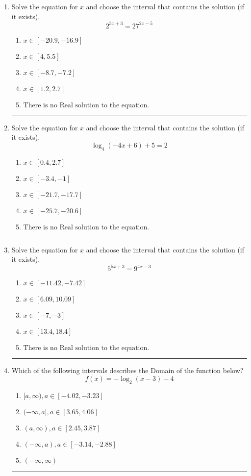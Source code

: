 \documentclass[14pt]{extbook}
\newcommand{\litem}[1]{\item#1\hspace*{-1cm}\rule{\textwidth}{0.4pt}}
\begin{document}
\begin{enumerate}
{\begin{enumerate}[label=\Alph*.]
\end{enumerate} }
\litem{
Solve the equation for $x$ and choose the interval that contains the solution (if it exists).\[ 2^{3x+3} = 27^{2x-5} \]\begin{enumerate}[label=\Alph*.]
\item \( x \in [-20.9, -16.9] \)
\item \( x \in [4, 5.5] \)
\item \( x \in [-8.7, -7.2] \)
\item \( x \in [1.2, 2.7] \)
\item \( \text{There is no Real solution to the equation.} \)

\end{enumerate} }
\litem{
Solve the equation for $x$ and choose the interval that contains the solution (if it exists).\[ \log_{4}{(-4x+6)}+5 = 2 \]\begin{enumerate}[label=\Alph*.]
\item \( x \in [0.4, 2.7] \)
\item \( x \in [-3.4, -1] \)
\item \( x \in [-21.7, -17.7] \)
\item \( x \in [-25.7, -20.6] \)
\item \( \text{There is no Real solution to the equation.} \)

\end{enumerate} }
\litem{
Solve the equation for $x$ and choose the interval that contains the solution (if it exists).\[ 5^{5x+3} = 9^{4x-3} \]\begin{enumerate}[label=\Alph*.]
\item \( x \in [-11.42, -7.42] \)
\item \( x \in [6.09, 10.09] \)
\item \( x \in [-7, -3] \)
\item \( x \in [13.4, 18.4] \)
\item \( \text{There is no Real solution to the equation.} \)

\end{enumerate} }
\litem{
Which of the following intervals describes the Domain of the function below?\[ f(x) = -\log_2{(x-3)}-4 \]\begin{enumerate}[label=\Alph*.]
\item \( [a, \infty), a \in [-4.02, -3.23] \)
\item \( (-\infty, a], a \in [3.65, 4.06] \)
\item \( (a, \infty), a \in [2.45, 3.87] \)
\item \( (-\infty, a), a \in [-3.14, -2.88] \)
\item \( (-\infty, \infty) \)


\end{enumerate}}
\end{enumerate}
\end{document}

